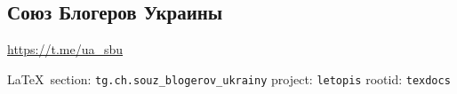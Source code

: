  
 
\subsection{Союз Блогеров Украины}
\url{https://t.me/ua_sbu}
  
\vspace{0.5cm}
 {\ifDEBUG\small\LaTeX~section: \verb|tg.ch.souz_blogerov_ukrainy| project: \verb|letopis| rootid: \verb|texdocs|	\fi}
\vspace{0.5cm}

  
